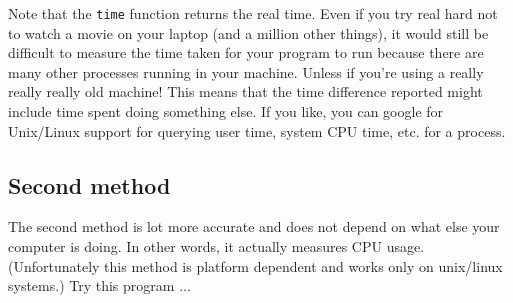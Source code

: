 Note that the \verb!time! function returns the real time.
Even if you try real hard not to watch a movie on your laptop
(and a million other things), 
it would still be difficult to measure the time
taken for your program to run because
there are many other processes running in your machine.
Unless if you're using a really really really old machine!
This means that the time difference reported might include time spent doing
something else.
If you like, you can google for Unix/Linux support for querying 
user time, system CPU time, etc. for a process.

\subsection{Second method}

The second method is lot more accurate and does not depend on
what else your computer is doing.
In other words, it actually measures CPU usage.
(Unfortunately this method is platform dependent and works only on
unix/linux systems.)
Try this program ...

\newpage
